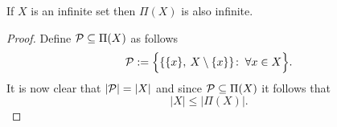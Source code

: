 \begin{rem}\label{rem:partfinsze}
  If $X$ is an infinite set then $\Pi(X)$ is also infinite.
\end{rem}

\begin{proof}
  Define $\P \subseteq \Pi(X)$ as follows
  \begin{equation*}
    \P := \Big\{ \{ \{x\}, \: X\setminus\{x\}\}\colon \: \forall x \in X \Big\}.
  \end{equation*}
  It is now clear that $\left| \P \right| = \left| X \right|$ and since $\P \subseteq \Pi(X)$ it follows that 
  \begin{equation*}
    \left| X \right| \leq \left| \Pi(X) \right|.
  \end{equation*}
\end{proof}
